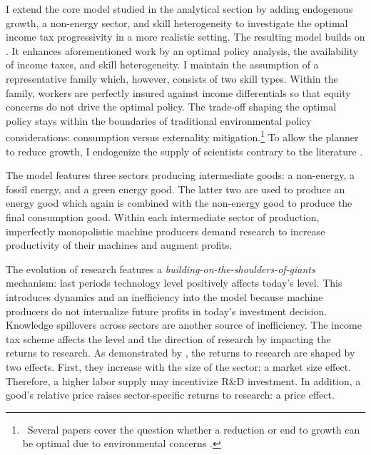  I extend the core model studied in the analytical section by adding endogenous growth, a non-energy sector, and skill heterogeneity to investigate the optimal income tax progressivity in a more realistic setting. The resulting model builds on \cite{Fried2018ClimateAnalysis}. It enhances aforementioned work by an optimal policy analysis, the availability of income taxes, and skill heterogeneity. 
I maintain the assumption of a representative family which, however, consists of two skill types. Within the family, workers are perfectly insured against income differentials so that equity concerns do not drive the optimal policy. The trade-off shaping the optimal policy stays within the boundaries of traditional environmental policy considerations: consumption versus externality mitigation.\footnote{\ Several papers cover the question whether a reduction or end to growth can be optimal due to environmental concerns \citep[for example,][]{Stokey1998AreGrowth, Acemoglu2012TheChange, Jones2016LifeGrowth}.}
To allow the planner to reduce growth, I endogenize the supply of scientists contrary to the literature \citep{Acemoglu2012TheChange, Fried2018ClimateAnalysis}. %

The model features three sectors producing intermediate goods:  a non-energy, a fossil energy, and a green energy good. The latter two are used to produce an energy good which again is combined with the non-energy good to produce the final consumption good.
Within each intermediate sector of production, imperfectly monopolistic machine producers demand research to increase productivity of their machines and augment profits. 

The evolution of research features a \textit{building-on-the-shoulders-of-giants} mechanism: last periods technology level positively affects today's level. This introduces dynamics and an inefficiency into the model because machine producers do not internalize future profits in today's investment decision. 
Knowledge spillovers across sectors are another source of inefficiency. The income tax scheme affects the level and the direction of research by impacting the returns to research.
As demonstrated by \cite{Acemoglu2002DirectedChange},
the returns to research are shaped by two effects. First, they increase with the size of the sector: a market size effect. Therefore, a higher labor supply may incentivize R\&D investment. In addition, a good's relative price raises sector-specific returns to research: a price effect. 


